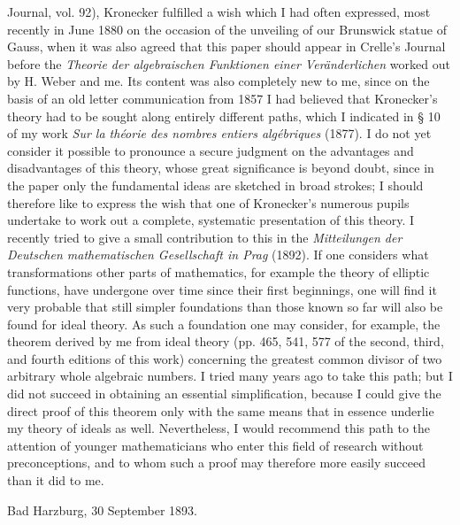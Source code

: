 \documentclass[11pt]{article}
\newcommand{\origpage}[1]{\par\vspace{0.25em}\noindent{\footnotesize\itshape [Printed page #1]}\par\vspace{0.25em}}
\begin{document}
\origpage{427}
Journal, vol. 92), Kronecker fulfilled a wish which I had often expressed, most recently in June 1880 on the occasion of the unveiling of our Brunswick statue of Gauss, when it was also agreed that this paper should appear in Crelle's Journal before the \textit{Theorie der algebraischen Funktionen einer Veränderlichen} worked out by H. Weber and me. Its content was also completely new to me, since on the basis of an old letter communication from 1857 I had believed that Kronecker's theory had to be sought along entirely different paths, which I indicated in § 10 of my work \textit{Sur la théorie des nombres entiers algébriques} (1877). I do not yet consider it possible to pronounce a secure judgment on the advantages and disadvantages of this theory, whose great significance is beyond doubt, since in the paper only the fundamental ideas are sketched in broad strokes; I should therefore like to express the wish that one of Kronecker's numerous pupils undertake to work out a complete, systematic presentation of this theory. I recently tried to give a small contribution to this in the \textit{Mitteilungen der Deutschen mathematischen Gesellschaft in Prag} (1892). If one considers what transformations other parts of mathematics, for example the theory of elliptic functions, have undergone over time since their first beginnings, one will find it very probable that still simpler foundations than those known so far will also be found for ideal theory. As such a foundation one may consider, for example, the theorem derived by me from ideal theory (pp. 465, 541, 577 of the second, third, and fourth editions of this work) concerning the greatest common divisor of two arbitrary whole algebraic numbers. I tried many years ago to take this path; but I did not succeed in obtaining an essential simplification, because I could give the direct proof of this theorem only with the same means that in essence underlie my theory of ideals as well. Nevertheless, I would recommend this path to the attention of younger mathematicians who enter this field of research without preconceptions, and to whom such a proof may therefore more easily succeed than it did to me.

\begin{flushleft}Bad Harzburg, 30 September 1893.\end{flushleft}
\end{document}
